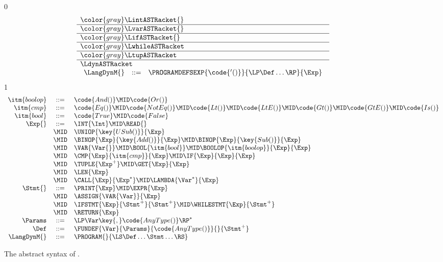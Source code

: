 \documentclass[7x10]{TimesAPriori_MIT}%
\newcommand{\gray}[1]{{\color{gray} #1}}
\def\racketEd{0}
\def\pythonEd{1}
\def\edition{1}
\newcommand{\pythonColor}[0]{}
\numberwithin{theorem}{chapter}
\numberwithin{definition}{chapter}
\numberwithin{equation}{chapter}
\begin{document}
\begin{figure}[tp]
\centering
\begin{tcolorbox}[colback=white]
    \small
{\if\edition\racketEd
\[
\begin{array}{l}
  \gray{\LintASTRacket{}} \\ \hline
  \gray{\LvarASTRacket{}} \\ \hline
  \gray{\LifASTRacket{}} \\ \hline
  \gray{\LwhileASTRacket} \\ \hline
  \gray{\LtupASTRacket} \\  \hline
\LdynASTRacket \\
\begin{array}{lcl}
  \LangDynM{} &::=& \PROGRAMDEFSEXP{\code{'()}}{\LP\Def\ldots\RP}{\Exp} 
\end{array}
\end{array}
\]
\fi}
{\if\edition\pythonEd\pythonColor
\[
\begin{array}{rcl}
\itm{boolop} &::=& \code{And()} \MID \code{Or()} \\
\itm{cmp} &::= & \code{Eq()} \MID \code{NotEq()} \MID \code{Lt()}
   \MID \code{LtE()} \MID \code{Gt()} \MID \code{GtE()} 
   \MID \code{Is()} \\
\itm{bool} &::=& \code{True} \MID \code{False} \\
\Exp{} &::=& \INT{\Int} \MID \READ{} \\
  &\MID& \UNIOP{\key{USub()}}{\Exp}\\
  &\MID&  \BINOP{\Exp}{\key{Add()}}{\Exp}  
    \MID  \BINOP{\Exp}{\key{Sub()}}{\Exp} \\
    &\MID& \VAR{\Var{}} 
  \MID \BOOL{\itm{bool}} 
     \MID \BOOLOP{\itm{boolop}}{\Exp}{\Exp}\\
  &\MID& \CMP{\Exp}{\itm{cmp}}{\Exp}  \MID \IF{\Exp}{\Exp}{\Exp} \\
  &\MID& \TUPLE{\Exp^{+}} \MID \GET{\Exp}{\Exp} \\
  &\MID& \LEN{\Exp} \\
  &\MID& \CALL{\Exp}{\Exp^{*}} \MID \LAMBDA{\Var^{*}}{\Exp} \\
\Stmt{} &::=& \PRINT{\Exp} \MID \EXPR{\Exp} \\
  &\MID& \ASSIGN{\VAR{\Var}}{\Exp}\\
  &\MID& \IFSTMT{\Exp}{\Stmt^{+}}{\Stmt^{+}} 
  \MID \WHILESTMT{\Exp}{\Stmt^{+}}\\
  &\MID& \RETURN{\Exp} \\
\Params &::=& \LP\Var\key{,}\code{AnyType()}\RP^*   \\
\Def &::=& \FUNDEF{\Var}{\Params}{\code{AnyType()}}{}{\Stmt^{+}}  \\
\LangDynM{} &::=& \PROGRAM{}{\LS \Def \ldots \Stmt \ldots \RS}
\end{array}
\]
\fi}
\end{tcolorbox}

\caption{The abstract syntax of \LangDyn{}.}
\label{fig:r7-syntax}
\end{figure}
\end{document}
